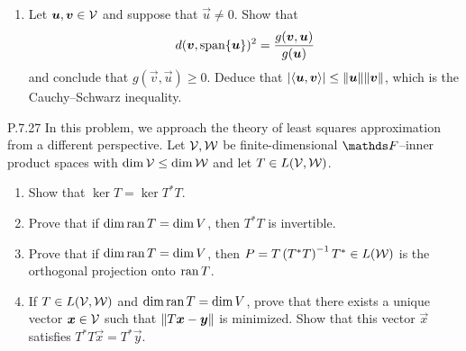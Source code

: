 \documentclass{../homework}
\begin{document}
\begin{problems}
\begin{enumerate}
    \begin{solution}

    \end{solution}

  \item Let \(\vec u, \vec v \in \Vspace\) and suppose that
    \(\vec u \ne 0\).  Show that
    \[
      d(\vec v, \lspan \set{\vec u})^2
      = \frac{g(\vec v, \vec u)}{g(\vec u)}
    \]
    and conclude that \(g(\vec v, \vec u) \ge 0\).  Deduce that
    \(\abs{\inner{\vec u, \vec v}} \le \norm{\vec u} \norm{\vec v}\),
    which is the Cauchy--Schwarz inequality.

    \begin{solution}

    \end{solution}
  \end{enumerate}

\item[P.7.27] In this problem, we approach the theory of least squares
  approximation from a different perspective.  Let
  \(\mathcal{V}, \mathcal{W}\) be finite-dimensional \(\FF\)--inner product
  spaces with \(\dim \mathcal{V} \le \dim \mathcal{W}\) and let
  \(T \in L(\mathcal{V}, \mathcal{W})\).
  \begin{enumerate}
  \item Show that \(\ker T = \ker T^* T\).

    \begin{solution}

    \end{solution}

  \item Prove that if \(\dim \operatorname{ran} T = \dim V\), then \(T^*T\) is
    invertible.

    \begin{solution}

    \end{solution}

  \item Prove that if \(\dim \operatorname{ran} T = \dim V\), then
    \(P = T \left( {T^* T} \right)^{-1} T^* \in L(\mathcal{W})\) is the orthogonal
    projection onto \(\operatorname{ran} T\).

    \begin{solution}

    \end{solution}

  \item If \(T \in L(\mathcal{V}, \mathcal{W})\) and \(\dim \operatorname{ran} T = \dim V\),
    prove that there exists a unique vector \(\vec x \in \Vspace\)
    such that \(\norm{T \vec x - \vec y}\) is minimized.  Show that
    this vector \(\vec x\) satisfies \(T^* T \vec x = T^* \vec y\).


\end{enumerate}
\end{problems}
\end{document}
